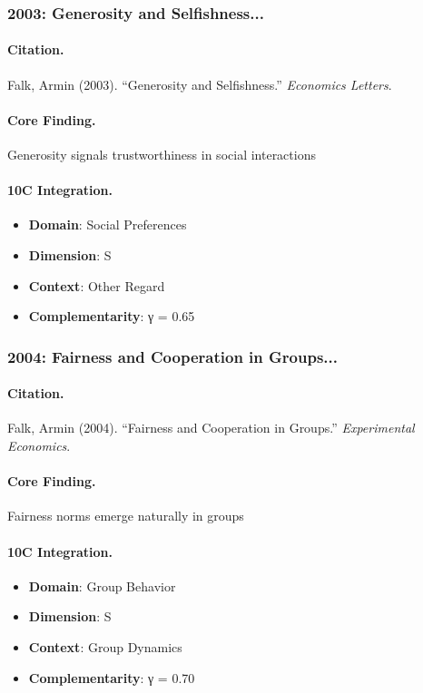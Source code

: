 \subsubsection{2003: Generosity and Selfishness...}

\paragraph{Citation.}
Falk, Armin (2003). ``Generosity and Selfishness.''
\textit{Economics Letters}.

\paragraph{Core Finding.}
Generosity signals trustworthiness in social interactions

\paragraph{10C Integration.}
\begin{itemize}[nosep]
  \item \textbf{Domain}: Social Preferences
  \item \textbf{Dimension}: S
  \item \textbf{Context}: Other Regard
  \item \textbf{Complementarity}: γ = 0.65
\end{itemize}


\subsubsection{2004: Fairness and Cooperation in Groups...}

\paragraph{Citation.}
Falk, Armin (2004). ``Fairness and Cooperation in Groups.''
\textit{Experimental Economics}.

\paragraph{Core Finding.}
Fairness norms emerge naturally in groups

\paragraph{10C Integration.}
\begin{itemize}[nosep]
  \item \textbf{Domain}: Group Behavior
  \item \textbf{Dimension}: S
  \item \textbf{Context}: Group Dynamics
  \item \textbf{Complementarity}: γ = 0.70
\end{itemize}


